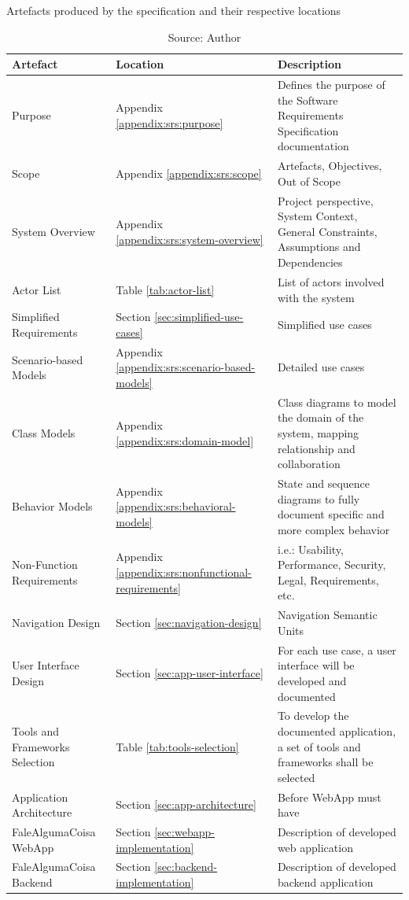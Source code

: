 \begin{table}[h]
\centering
\caption{Artefacts produced by the specification and their respective locations}
\label{tab:artifact-locations}
\begin{tabular}{|p{3.5cm}|p{2.5cm}|p{9cm}|}
    \hline 
    Artefact & Location & Description \\ \hline 
    Purpose & Appendix \ref{appendix:srs:purpose} & Defines the purpose of the Software Requirements Specification documentation \\ \hline
    Scope & Appendix \ref{appendix:srs:scope} & Artefacts, Objectives, Out of Scope \\ \hline
    System Overview & Appendix \ref{appendix:srs:system-overview} & Project perspective, System Context, General Constraints, Assumptions and Dependencies \\ \hline
    Actor List & Table \ref{tab:actor-list} & List of actors involved with the system \\ \hline 
    Simplified Requirements & Section \ref{sec:simplified-use-cases} & Simplified use cases \\ \hline
    Scenario-based Models & Appendix \ref{appendix:srs:scenario-based-models} & Detailed use cases \\ \hline
    Class Models & Appendix \ref{appendix:srs:domain-model} & Class diagrams to model the domain of the system, mapping relationship and collaboration \\ \hline
    Behavior Models & Appendix \ref{appendix:srs:behavioral-models} & State and sequence diagrams to fully document specific and more complex behavior \\ \hline
    Non-Function Requirements & Appendix \ref{appendix:srs:nonfunctional-requirements} & i.e.: Usability, Performance, Security, Legal, Requirements, etc. \\ \hline
    Navigation Design & Section \ref{sec:navigation-design} & Navigation Semantic Units \\ \hline
    User Interface Design & Section \ref{sec:app-user-interface} & For each use case, a user interface will be developed and documented \\ \hline
    Tools and Frameworks Selection & Table \ref{tab:tools-selection} & To develop the documented application, a set of tools and frameworks shall be selected \\ \hline
    Application Architecture & Section \ref{sec:app-architecture} & Before WebApp must have  \\ \hline
    FaleAlgumaCoisa WebApp & Section \ref{sec:webapp-implementation} & Description of developed web application \\ \hline
    FaleAlgumaCoisa Backend & Section \ref{sec:backend-implementation} & Description of developed backend application \\ \hline
\end{tabular}
\caption*{Source: Author}
\end{table}

